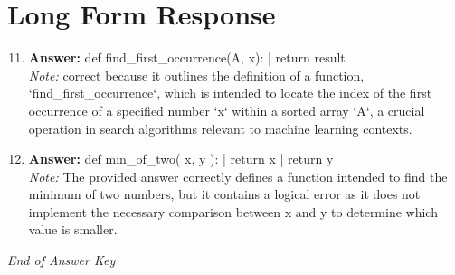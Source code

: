 \documentclass[12pt]{article}
\begin{document}
\section*{Long Form Response}
\begin{enumerate}[label=\arabic*.]
\setcounter{enumi}{10}
\item \textbf{Answer:} def find\_first\_occurrence(A, x): | return result
\\ \textit{Note:} correct because it outlines the definition of a function, `find\_first\_occurrence`, which is intended to locate the index of the first occurrence of a specified number `x` within a sorted array `A`, a crucial operation in search algorithms relevant to machine learning contexts.
\item \textbf{Answer:} def min\_of\_two( x, y ): | return x | return y
\\ \textit{Note:} The provided answer correctly defines a function intended to find the minimum of two numbers, but it contains a logical error as it does not implement the necessary comparison between x and y to determine which value is smaller.
\end{enumerate}

\vfill
\noindent\textit{End of Answer Key}
\end{document}
